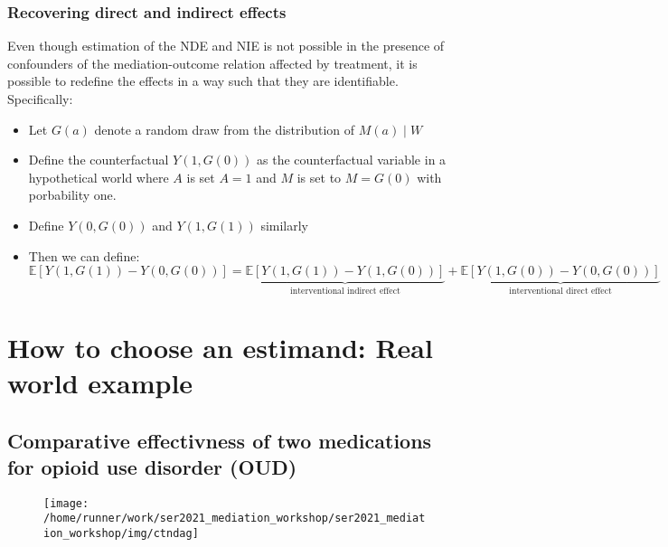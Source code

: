 \documentclass[
  12pt, krantz2,
]{book}
\providecommand{\tightlist}{%
  \setlength{\itemsep}{0pt}\setlength{\parskip}{0pt}}
\theoremstyle{definition}
\theoremstyle{definition}
\theoremstyle{definition}
\newcommand{\E}{\mathbb{E}}
\newcommand{\1}{\mathbbm{1}}
\begin{document}
\hypertarget{recovering-direct-and-indirect-effects}{%
\subsection{Recovering direct and indirect effects}\label{recovering-direct-and-indirect-effects}}

Even though estimation of the NDE and NIE is not possible in the
presence of confounders of the mediation-outcome relation affected by
treatment, it is possible to redefine the effects in a way such that
they are identifiable. Specifically:

\begin{itemize}
\tightlist
\item
  Let \(G(a)\) denote a random draw from the distribution of \(M(a) \mid W\)
\item
  Define the counterfactual \(Y(1,G(0))\) as the counterfactual
  variable in a hypothetical world where \(A\) is set \(A=1\) and \(M\) is
  set to \(M=G(0)\) with porbability one.
\item
  Define \(Y(0,G(0))\) and \(Y(1,G(1))\) similarly
\item
  Then we can define:
  \begin{equation*}
    \E[Y(1,G(1)) - Y(0,G(0))] = \underbrace{\E[Y(1,G(1)) -
      Y(1,G(0))]}_{\text{interventional indirect effect}} +
      \underbrace{\E[Y(1,G(0)) -
      Y(0,G(0))]}_{\text{interventional direct effect}}
  \end{equation*}
\end{itemize}

\hypertarget{estimandirl}{%
\chapter{How to choose an estimand: Real world example}\label{estimandirl}}

\hypertarget{comparative-effectivness-of-two-medications-for-opioid-use-disorder-oud}{%
\section{Comparative effectivness of two medications for opioid use disorder (OUD)}\label{comparative-effectivness-of-two-medications-for-opioid-use-disorder-oud}}

\begin{figure}

{\centering \texttt{[image: /home/runner/work/ser2021\_mediation\_workshop/ser2021\_mediation\_workshop/img/ctndag]} 

}

\end{figure}
\end{document}
